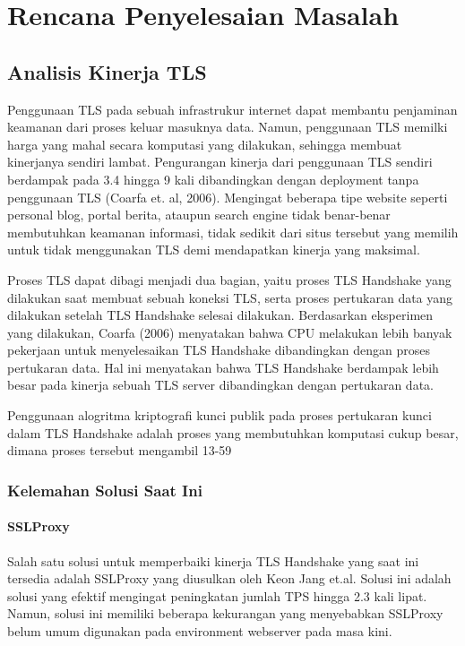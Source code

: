 \chapter{Rencana Penyelesaian Masalah}

\section{Analisis Kinerja TLS}
Penggunaan TLS pada sebuah infrastrukur internet dapat membantu penjaminan keamanan dari proses keluar masuknya data. Namun, penggunaan TLS memilki harga yang mahal secara komputasi yang dilakukan, sehingga membuat kinerjanya sendiri lambat. Pengurangan kinerja dari penggunaan TLS sendiri berdampak pada 3.4 hingga 9 kali dibandingkan dengan deployment tanpa penggunaan TLS (Coarfa et. al, 2006). Mengingat beberapa tipe website seperti personal blog, portal berita, ataupun search engine tidak benar-benar membutuhkan keamanan informasi, tidak sedikit dari situs tersebut yang memilih untuk tidak menggunakan TLS demi mendapatkan kinerja yang maksimal.

Proses TLS dapat dibagi menjadi dua bagian, yaitu proses TLS Handshake yang dilakukan saat membuat sebuah koneksi TLS, serta proses pertukaran data yang dilakukan setelah TLS Handshake selesai dilakukan. Berdasarkan eksperimen yang dilakukan, Coarfa (2006) menyatakan bahwa CPU melakukan lebih banyak pekerjaan untuk menyelesaikan TLS Handshake dibandingkan dengan proses pertukaran data. Hal ini menyatakan bahwa TLS Handshake berdampak lebih besar pada kinerja sebuah TLS server dibandingkan dengan pertukaran data.

Penggunaan alogritma kriptografi kunci publik pada proses pertukaran kunci  dalam TLS Handshake adalah proses yang membutuhkan komputasi cukup besar, dimana proses tersebut mengambil 13-59%

  \subsection{Kelemahan Solusi Saat Ini}
    \subsubsection{SSLProxy}
    Salah satu solusi untuk memperbaiki kinerja TLS Handshake yang saat ini tersedia adalah SSLProxy yang diusulkan oleh Keon Jang et.al. Solusi ini adalah solusi yang efektif mengingat peningkatan jumlah TPS hingga 2.3 kali lipat. Namun, solusi ini memiliki beberapa kekurangan yang menyebabkan SSLProxy belum umum digunakan pada environment webserver pada masa kini.

